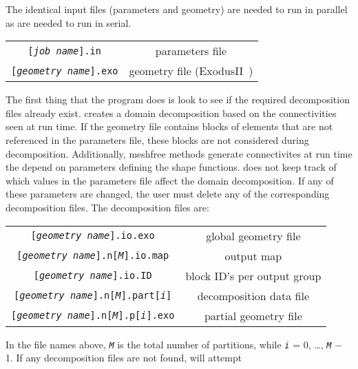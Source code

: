 The identical input files (parameters and geometry) are needed to run in
parallel as are needed to run in serial.
\begin{center}
\begin{tabular}[c]{c c}
 \parbox[b]{3.0in}{\raggedleft \texttt{[\textsl{job name}].in}}
&\parbox[b]{3.0in}{parameters file}\\
 \parbox[b]{3.0in}{\raggedleft \texttt{[\textsl{geometry name}].exo}}
&\parbox[b]{3.0in}{geometry file (\textsf{ExodusII}~\cite{exodusII})}\\
\end{tabular}
\end{center}
The first thing that the program does is look to see if the required
decomposition files already exist.  \tahoe creates a domain decomposition
based on the connectivities seen at run time.  If the geometry file
contains blocks of elements that are not referenced in the parameters file,
these blocks are not considered during decomposition.  Additionally,
meshfree methods generate connectivites at run time the depend on
parameters defining the shape functions.  \tahoe does not keep track of
which values in the parameters file affect the domain decomposition.  If
any of these parameters are changed, the user must delete any of the
corresponding decomposition files.  The decomposition files are:
\begin{center}
\begin{tabular}[c]{c c}
 \parbox[b]{3.0in}{\raggedleft \texttt{[\textsl{geometry name}].io.exo}}
&\parbox[b]{3.0in}{global geometry file}\\
 \parbox[b]{3.0in}{\raggedleft \texttt{[\textsl{geometry name}].n[\textsl{M}].io.map}}
&\parbox[b]{3.0in}{output map}\\
 \parbox[b]{3.0in}{\raggedleft \texttt{[\textsl{geometry name}].io.ID}}
&\parbox[b]{3.0in}{block ID's per output group}\\
 \parbox[b]{3.0in}{\raggedleft \texttt{[\textsl{geometry name}].n[\textsl{M}].part[\textsl{i}]}}
&\parbox[b]{3.0in}{decomposition data file}\\
 \parbox[b]{3.0in}{\raggedleft \texttt{[\textsl{geometry name}].n[\textsl{M}].p[\textsl{i}].exo}}
&\parbox[b]{3.0in}{partial geometry file}
\end{tabular}
\end{center}
In the file names above, \texttt{\textsl{M}} is the total number of partitions, 
while \texttt{\textsl{i}} =
0, \ldots, \texttt{\textsl{M}} $-$ 1.  
If any decomposition files are not found, \tahoe will attempt
